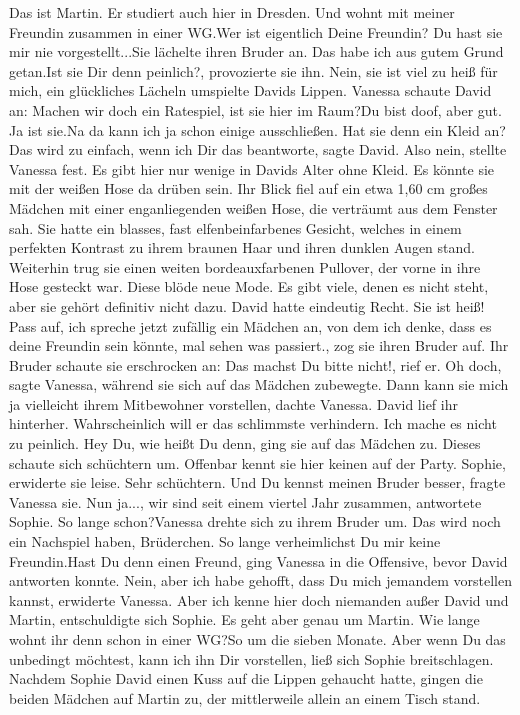 \documentclass{article}
\begin{document}
	\guillemotright Das ist Martin. Er studiert auch hier in Dresden. Und wohnt mit meiner Freundin zusammen in einer WG.\guillemotleft \guillemotright Wer ist eigentlich Deine Freundin? Du hast sie mir nie vorgestellt...\guillemotleft  Sie lächelte ihren Bruder an. \guillemotright Das habe ich aus gutem Grund getan.\guillemotleft \guillemotright Ist sie Dir denn peinlich?\guillemotleft, provozierte sie ihn. \guillemotright Nein, sie ist viel zu heiß für mich\guillemotleft, ein glückliches Lächeln umspielte Davids Lippen. Vanessa schaute David an: \guillemotright Machen wir doch ein Ratespiel, ist sie hier im Raum?\guillemotleft \guillemotright Du bist doof, aber gut. Ja ist sie.\guillemotleft  Na da kann ich ja schon einige ausschließen. \guillemotright Hat sie denn ein Kleid an?\guillemotleft \guillemotright Das wird zu einfach, wenn ich Dir das beantworte\guillemotleft, sagte David. \guillemotright Also nein\guillemotleft, stellte Vanessa fest. Es gibt hier nur wenige in Davids Alter ohne Kleid. Es könnte sie mit der weißen Hose da drüben sein. Ihr Blick fiel auf ein etwa 1,60 cm großes Mädchen mit einer enganliegenden weißen Hose, die verträumt aus dem Fenster sah. Sie hatte ein blasses, fast elfenbeinfarbenes Gesicht, welches in einem perfekten Kontrast zu ihrem braunen Haar und ihren dunklen Augen stand. Weiterhin trug sie einen weiten bordeauxfarbenen Pullover, der vorne in ihre Hose gesteckt war. Diese blöde neue Mode. Es gibt viele, denen es nicht steht, aber sie gehört definitiv nicht dazu. David hatte eindeutig Recht. Sie ist heiß! \guillemotright Pass auf, ich spreche jetzt zufällig ein Mädchen an, von dem ich denke, dass es deine Freundin sein könnte, mal sehen was passiert.\guillemotleft, zog sie ihren Bruder auf. Ihr Bruder schaute sie erschrocken an: \guillemotright Das machst Du bitte nicht!\guillemotleft, rief er. \guillemotright Oh doch\guillemotleft, sagte Vanessa, während sie sich auf das Mädchen zubewegte. Dann kann sie mich ja vielleicht ihrem Mitbewohner vorstellen, dachte Vanessa. David lief ihr hinterher. Wahrscheinlich will er das schlimmste verhindern. Ich mache es nicht zu peinlich. \guillemotright Hey Du, wie heißt Du denn\guillemotleft, ging sie auf das Mädchen zu. Dieses schaute sich schüchtern um. Offenbar kennt sie hier keinen auf der Party. \guillemotright Sophie\guillemotleft, erwiderte sie leise. Sehr schüchtern. \guillemotright Und Du kennst meinen Bruder besser\guillemotleft, fragte Vanessa sie. \guillemotright Nun ja..., wir sind seit einem viertel Jahr zusammen\guillemotleft, antwortete Sophie. \guillemotright So lange schon?\guillemotleft  Vanessa drehte sich zu ihrem Bruder um. \guillemotright Das wird noch ein Nachspiel haben, Brüderchen. So lange verheimlichst Du mir keine Freundin.\guillemotleft \guillemotright Hast Du denn einen Freund\guillemotleft, ging Vanessa in die Offensive, bevor David antworten konnte. \guillemotright Nein, aber ich habe gehofft, dass Du mich jemandem vorstellen kannst\guillemotleft, erwiderte Vanessa. \guillemotright Aber ich kenne hier doch niemanden außer David und Martin\guillemotleft, entschuldigte sich Sophie. \guillemotright Es geht aber genau um Martin. Wie lange wohnt ihr denn schon in einer WG?\guillemotleft \guillemotright So um die sieben Monate. Aber wenn Du das unbedingt möchtest, kann ich ihn Dir vorstellen\guillemotleft, ließ sich Sophie breitschlagen. Nachdem Sophie David einen Kuss auf die Lippen gehaucht hatte, gingen die beiden Mädchen auf Martin zu, der mittlerweile allein an einem Tisch stand.
\end{document}
